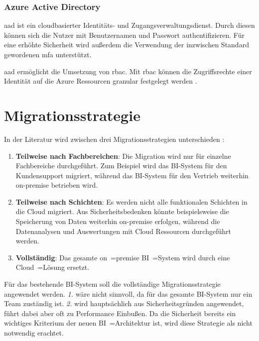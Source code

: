\subsubsection{Azure Active Directory} \label{subsec:grundlagen:azure:sicherheitUndDatenschutz:aad}
\ac{aad} ist ein cloudbasierter Identitäts- und Zugangsverwaltungsdienst. Durch diesen können sich die Nutzer mit Benutzernamen und Passwort authentifizieren. Für eine erhöhte Sicherheit wird außerdem die Verwendung der inzwischen Standard gewordenen \ac{mfa} unterstützt.

\ac{aad} ermöglicht die Umsetzung von \ac{rbac}. Mit \ac{rbac} können die Zugriffsrechte einer Identität auf die Azure Ressourcen granular festgelegt werden \cite{stefanovic_azure_2021}.


\section{Migrationsstrategie} \label{sec:beschreibungMigrationsstrategie}
In der Literatur wird zwischen drei Migrationsstrategien unterschieden \cite{juan-verdejo_moving_2014}:
\begin{enumerate}
\item \textbf{Teilweise nach Fachbereichen}: Die Migration wird nur für einzelne Fachbereiche durchgeführt. Zum Beispiel wird das BI-System für den Kundensupport migriert, während das BI-System für den Vertrieb weiterhin on-premise betrieben wird.
\item \textbf{Teilweise nach Schichten}: Es werden nicht alle funktionalen Schichten in die Cloud migriert. Aus Sicherheitsbedenken könnte beispielsweise die Speicherung von Daten weiterhin on-premise erfolgen, während die Datenanalysen und Auswertungen mit Cloud Ressourcen durchgeführt werden.
\item \textbf{Vollständig}: Das gesamte on~=premise BI~=System wird durch eine Cloud~=Lösung ersetzt.
\end{enumerate}
Für das bestehende BI-System soll die vollständige Migrationsstrategie angewendet werden. \textit{1.} wäre nicht sinnvoll, da für das gesamte BI-System nur ein Team zuständig ist. \textit{2.} wird hauptsächlich aus Sicherheitsgründen angewendet, führt dabei aber oft zu Performance Einbußen. Da die Sicherheit bereits ein wichtiges Kriterium der neuen BI~=Architektur ist, wird diese Strategie als nicht notwendig erachtet.

